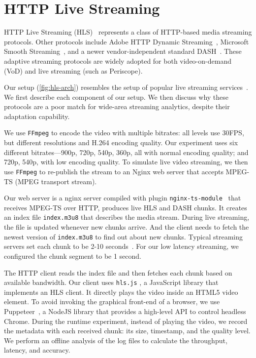\documentclass[twocolumn]{article}
\begin{document}
\section{HTTP Live Streaming}
\label{appendix:hls}

HTTP Live Streaming (HLS)~\cite{pantos2016http} represents a class of HTTP-based
media streaming protocols. Other protocols include Adobe HTTP Dynamic
Streaming~\cite{adobestreaming}, Microsoft Smooth
Streaming~\cite{zambelli2009iis}, and a newer vendor-independent standard
DASH~\cite{michalos2012dynamic, sodagar2011mpeg}. These adaptive streaming
protocols are widely adopted for both video-on-demand (VoD) and live streaming
(such as Periscope).

Our setup (\autoref{fig:hls-arch}) resembles the setup of popular live streaming
services~\cite{wang2016anatomy}. We first describe each component of our
setup. We then discuss why these protocols are a poor match for wide-area
streaming analytics, despite their adaptation capability.

 We use \texttt{FFmpeg} to encode the video with multiple bitrates:
all levels use 30FPS, but different resolutions and H.264 encoding quality. Our
experiment uses six different bitrates---900p, 720p, 540p, 360p, all with normal
encoding quality; and 720p, 540p, with low encoding quality. To simulate live
video streaming, we then use \texttt{FFmpeg} to re-publish the stream to an
Nginx web server that accepts MPEG-TS (MPEG transport stream).

 Our web server is a nginx server compiled with plugin
\texttt{nginx-ts-module}~\cite{nginx-ts-module} that receives MPEG-TS over HTTP,
produces live HLS and DASH chunks. It creates an index file \texttt{index.m3u8}
that describes the media stream. During live streaming, the file is updated
whenever new chunks arrive. And the client needs to fetch the newest version of
\texttt{index.m3u8} to find out about new chunks. Typical streaming servers set
each chunk to be 2-10 seconds~\cite{mao2017neural, sun2016cs2p,
  wang2016anatomy}. For our low latency streaming, we configured the chunk
segment to be 1 second.

 The HTTP client reads the index file and then fetches each
chunk based on available bandwidth. Our client uses \texttt{hls.js}
\cite{hls.js}, a JavaScript library that implements an HLS client. It directly
plays the video inside an HTML5 video element. To avoid invoking the graphical
front-end of a browser, we use Puppeteer~\cite{puppeteer}, a NodeJS library that
provides a high-level API to control headless Chrome. During the runtime
experiment, instead of playing the video, we record the metadata with each
received chunk: its size, timestamp, and the quality level. We perform an
offline analysis of the log files to calculate the throughput, latency, and
accuracy.
\end{document}
